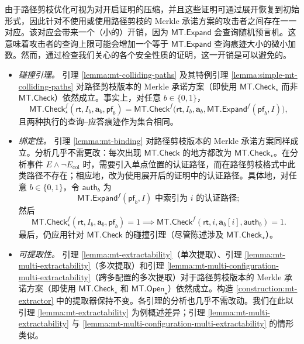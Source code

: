\documentclass[american,singlepageview]{snargs-book-zh}
\newcommand{\Bits}{\{0,1\}}
\newcommand{\Event}{E}
\newcommand{\CollisionEvent}{\Event_{\mathrm{col}}}
\newcommand{\ROFunction}{f}
\newcommand{\MTSymbol}{\mathsf{MT}}
\newcommand{\MTOpen}{\MTSymbol.\mathsf{Open}}
\newcommand{\MTCheck}{\MTSymbol.\mathsf{Check}}
\newcommand{\MTCommitment}{\mathsf{rt}}
\newcommand{\MTAuthPath}{\mathsf{auth}}
\newcommand{\MTProof}{\mathsf{pf}}
\newcommand{\MTMessageIndex}{i}
\newcommand{\MTMessageIndexSet}{I}
\newcommand{\MTMessageSubVector}{\mathbf{a}}
\newcommand{\MTExpandOpening}{\MTSymbol.\mathsf{Expand}}
\begin{document}
由于路径剪枝优化可视为对开启证明的压缩，并且这些证明可通过展开恢复到初始形式，因此针对不使用或使用路径剪枝的 Merkle 承诺方案的攻击者之间存在一一对应。该对应会带来一个（小的）开销，因为 $\MTExpandOpening$ 会查询随机预言机。这意味着攻击者的查询上限可能会增加一个等于 $\MTExpandOpening$ 查询痕迹大小的微小加数。然而，通过检查我们关心的各个安全性质的证明，这一开销是可以避免的。
\begin{itemize}

  \item \emph{碰撞引理。}
  引理 \ref{lemma:mt-colliding-paths} 及其特例引理 \ref{lemma:simple-mt-colliding-paths} 对路径剪枝版本的 Merkle 承诺方案（即使用 $\MTCheck_{\star}$ 而非 $\MTCheck$）依然成立。事实上，对任意 $b\in\Bits$，
  \[
    \MTCheck_{\star}^{\ROFunction}(\MTCommitment,\MTMessageIndexSet_{b},\MTMessageSubVector_{b},\MTProof_{b})
    =
    \MTCheck^{\ROFunction}\bigl(\MTCommitment,\MTMessageIndexSet_{b},\MTMessageSubVector_{b},\MTExpandOpening^{\ROFunction}(\MTProof_{b},\MTMessageIndexSet)\bigr),
  \]
  且两种执行的查询–应答痕迹作为集合相同。

  \item \emph{绑定性。}
  引理 \ref{lemma:mt-binding} 对路径剪枝版本的 Merkle 承诺方案同样成立。分析几乎不需更改：每次出现 $\MTCheck$ 的地方都改为 $\MTCheck_{\star}$。在分析事件 $\Event\land\neg\CollisionEvent$ 时，需要引入单点位置的认证路径，而在路径剪枝格式中此类路径不存在；相应地，改为使用展开后的证明中的认证路径。具体地，对任意 $b\in\Bits$，令 $\MTAuthPath_{b}$ 为
  \[
    \MTExpandOpening^{\ROFunction}(\MTProof_{b},\MTMessageIndexSet)
    \text{ 中索引为 }\MTMessageIndex\text{ 的认证路径};
  \]
  然后
  \[
    \MTCheck_{\star}^{\ROFunction}(\MTCommitment,\MTMessageIndexSet_{b},\MTMessageSubVector_{b},\MTProof_{b})=1
    \implies
    \MTCheck^{\ROFunction}(\MTCommitment,\MTMessageIndex,\MTMessageSubVector_{b}[\MTMessageIndex],\MTAuthPath_{b})=1.
  \]
  最后，仍应用针对 $\MTCheck$ 的碰撞引理（尽管陈述涉及 $\MTCheck_{\star}$）。

  \item \emph{可提取性。}
  引理 \ref{lemma:mt-extractability}（单次提取）、引理 \ref{lemma:mt-multi-extractability}（多次提取）和引理 \ref{lemma:mt-multi-configuration-multi-extractability}（跨多配置的多次提取）对于路径剪枝版本的 Merkle 承诺方案（即使用 $\MTCheck_{\star}$ 和 $\MTOpen_{\star}$）依然成立。构造 \ref{construction:mt-extractor} 中的提取器保持不变。各引理的分析也几乎不需改动。我们在此以引理 \ref{lemma:mt-extractability} 为例概述差异；引理 \ref{lemma:mt-multi-extractability} 与 \ref{lemma:mt-multi-configuration-multi-extractability} 的情形类似。


\end{itemize}
\end{document}
